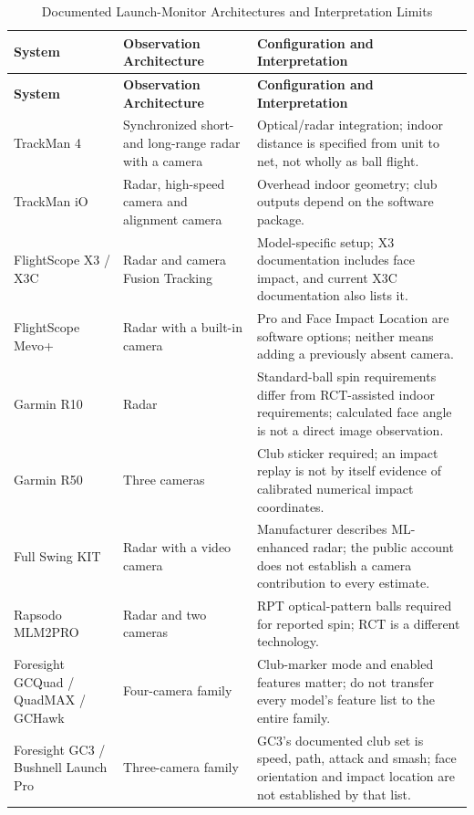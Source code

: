 \begingroup
\small
\setlength{\tabcolsep}{4pt}
\begin{longtable}{@{}p{3.0cm}p{5.2cm}p{6.2cm}@{}}
\caption{Documented Launch-Monitor Architectures and Interpretation Limits}\label{tab:survey}\\
\toprule
\textbf{System} & \textbf{Observation Architecture} & \textbf{Configuration and Interpretation} \\
\midrule
\endfirsthead
\toprule
\textbf{System} & \textbf{Observation Architecture} & \textbf{Configuration and Interpretation} \\
\midrule
\endhead
\bottomrule
\endfoot
TrackMan 4 & Synchronized short- and long-range radar with a camera & Optical/radar integration; indoor distance is specified from unit to net, not wholly as ball flight. \\
TrackMan iO & Radar, high-speed camera and alignment camera & Overhead indoor geometry; club outputs depend on the software package. \\
FlightScope X3 / X3C & Radar and camera Fusion Tracking & Model-specific setup; X3 documentation includes face impact, and current X3C documentation also lists it. \\
FlightScope Mevo+ & Radar with a built-in camera & Pro and Face Impact Location are software options; neither means adding a previously absent camera. \\
Garmin R10 & Radar & Standard-ball spin requirements differ from RCT-assisted indoor requirements; calculated face angle is not a direct image observation. \\
Garmin R50 & Three cameras & Club sticker required; an impact replay is not by itself evidence of calibrated numerical impact coordinates. \\
Full Swing KIT & Radar with a video camera & Manufacturer describes ML-enhanced radar; the public account does not establish a camera contribution to every estimate. \\
Rapsodo MLM2PRO & Radar and two cameras & RPT optical-pattern balls required for reported spin; RCT is a different technology. \\
Foresight GCQuad / QuadMAX / GCHawk & Four-camera family & Club-marker mode and enabled features matter; do not transfer every model's feature list to the entire family. \\
Foresight GC3 / Bushnell Launch Pro & Three-camera family & GC3's documented club set is speed, path, attack and smash; face orientation and impact location are not established by that list. \\

\end{longtable}
